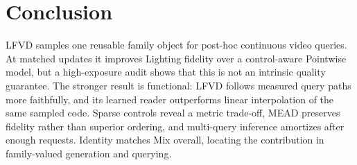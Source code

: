 \section{Conclusion}

LFVD samples one reusable family object for post-hoc continuous video queries.
At matched updates it improves Lighting fidelity over a control-aware
Pointwise model, but a high-exposure audit shows that this is not an intrinsic
quality guarantee. The stronger result is functional: LFVD follows measured
query paths more faithfully, and its learned reader outperforms linear
interpolation of the same sampled code. Sparse controls reveal a metric
trade-off, MEAD preserves fidelity rather than superior ordering, and
multi-query inference amortizes after enough requests. Identity matches Mix
overall, locating the contribution in family-valued generation and querying.
